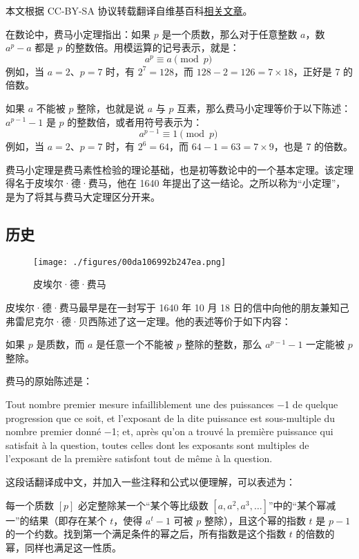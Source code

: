 
本文根据 CC-BY-SA 协议转载翻译自维基百科\href{https://en.wikipedia.org/wiki/Fermat\%27s_little_theorem}{相关文章}。

在数论中，费马小定理指出：如果 $p$ 是一个质数，那么对于任意整数 $a$，数 $a^p - a$ 都是 $p$ 的整数倍。用模运算的记号表示，就是：
$$
a^p \equiv a \pmod{p}~
$$
例如，当 $a = 2$、$p = 7$ 时，有 $2^7 = 128$，而 $128 - 2 = 126 = 7 \times 18$，正好是 7 的倍数。

如果 $a$ 不能被 $p$ 整除，也就是说 $a$ 与 $p$ 互素，那么费马小定理等价于以下陈述：$a^{p-1} - 1$ 是 $p$ 的整数倍，或者用符号表示为：
$$
a^{p-1} \equiv 1 \pmod{p}~
$$
例如，当 $a = 2$、$p = 7$ 时，有 $2^6 = 64$，而 $64 - 1 = 63 = 7 \times 9$，也是 7 的倍数。

费马小定理是费马素性检验的理论基础，也是初等数论中的一个基本定理。该定理得名于皮埃尔·德·费马，他在 1640 年提出了这一结论。之所以称为“小定理”，是为了将其与费马大定理区分开来。
\subsection{历史}
\begin{figure}[ht]
\centering
\texttt{[image: ./figures/00da106992b247ea.png]}
\caption{皮埃尔·德·费马} \label{fig_FMxdl_1}
\end{figure}
皮埃尔·德·费马最早是在一封写于 1640 年 10 月 18 日的信中向他的朋友兼知己弗雷尼克尔·德·贝西陈述了这一定理。他的表述等价于如下内容：

如果 $p$ 是质数，而 $a$ 是任意一个不能被 $p$ 整除的整数，那么 $a^{p-1} - 1$ 一定能被 $p$ 整除。

费马的原始陈述是：

Tout nombre premier mesure infailliblement une des puissances −1 de quelque progression que ce soit, et l'exposant de la dite puissance est sous-multiple du nombre premier donné −1; et, après qu'on a trouvé la première puissance qui satisfait à la question, toutes celles dont les exposants sont multiples de l'exposant de la première satisfont tout de même à la question.

这段话翻译成中文，并加入一些注释和公式以便理解，可以表述为：

每一个质数 $[p]$ 必定整除某一个“某个等比级数 $[a, a^2, a^3, \dots]$”中的“某个幂减一”的结果（即存在某个 $t$，使得 $a^t - 1$ 可被 $p$ 整除），且这个幂的指数 $t$ 是 $p - 1$ 的一个约数。找到第一个满足条件的幂之后，所有指数是这个指数 $t$ 的倍数的幂，同样也满足这一性质。


